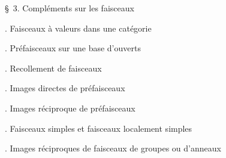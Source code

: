 \noindent\quad \S\ 3. Compléments sur les faisceaux\dotfill

\noindent{}. Faisceaux à valeurs dans une catégorie\dotfill

\noindent{}. Préfaisceaux sur une base d'ouverts\dotfill

\noindent{}. Recollement de faisceaux\dotfill

\noindent{}. Images directes de préfaisceaux\dotfill

\noindent{}. Images réciproque de préfaisceaux\dotfill

\noindent{}. Faisceaux simples et faisceaux localement simples\dotfill

\noindent{}. Images réciproques de faisceaux de groupes ou d'anneaux\dotfill

